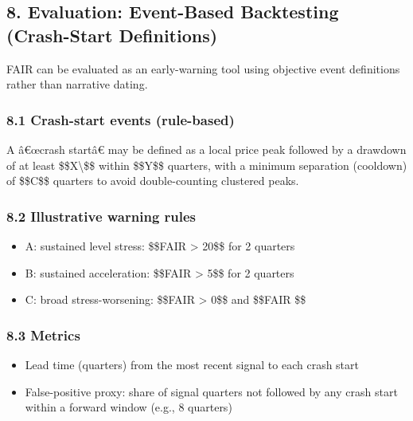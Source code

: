\subsection{8. Evaluation: Event-Based Backtesting (Crash-Start
Definitions)}\label{evaluation-event-based-backtesting-crash-start-definitions}

FAIR can be evaluated as an early-warning tool using objective event
definitions rather than narrative dating.

\subsubsection{8.1 Crash-start events
(rule-based)}\label{crash-start-events-rule-based}

A â€œcrash startâ€ may be defined as a local price peak followed by a
drawdown of at least \$\$X\textbackslash\$\$ within \$\$Y\$\$ quarters,
with a minimum separation (cooldown) of \$\$C\$\$ quarters to avoid
double-counting clustered peaks.

\subsubsection{8.2 Illustrative warning
rules}\label{illustrative-warning-rules}

\begin{itemize}
\tightlist
\item
  A: sustained level stress: \$\$FAIR \textgreater{} 20\$\$ for 2
  quarters
\item
  B: sustained acceleration: \$\$\Delta FAIR \textgreater{} 5\$\$ for 2
  quarters
\item
  C: broad stress-worsening: \$\$FAIR \textgreater{} 0\$\$ and
  \$\$\Delta FAIR \$\$
\end{itemize}

\subsubsection{8.3 Metrics}\label{metrics}

\begin{itemize}
\tightlist
\item
  Lead time (quarters) from the most recent signal to each crash start
\item
  False-positive proxy: share of signal quarters not followed by any
  crash start within a forward window (e.g., 8 quarters)
\end{itemize}

